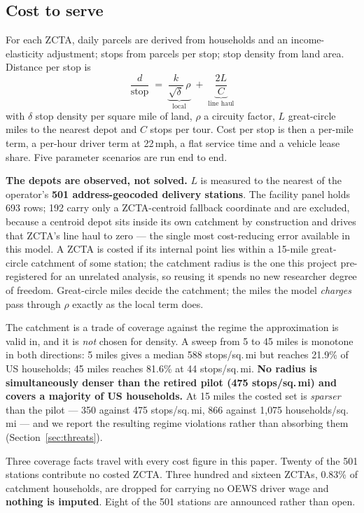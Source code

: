 \documentclass[conference]{IEEEtran}
\begin{document}
\subsection{Cost to serve}

For each ZCTA, daily parcels are derived from households and an
income-elasticity adjustment; stops from parcels per stop; stop density from
land area. Distance per stop is
\begin{equation}
\frac{d}{\text{stop}} \;=\;
\underbrace{\frac{k}{\sqrt{\delta}}\,\rho}_{\text{local}}
\;+\;
\underbrace{\frac{2L}{C}}_{\text{line haul}}
\end{equation}
with $\delta$ stop density per square mile of land, $\rho$ a circuity factor,
$L$ great-circle miles to the nearest depot and $C$ stops per tour. Cost per
stop is then a per-mile term, a per-hour driver term at 22\,mph, a flat
service time and a vehicle lease share. Five parameter scenarios are run end
to end.

\textbf{The depots are observed, not solved.} $L$ is measured to the nearest
of the operator's \textbf{501 address-geocoded delivery stations}. The
facility panel holds 693 rows; 192 carry only a ZCTA-centroid fallback
coordinate and are excluded, because a centroid depot sits inside its own
catchment by construction and drives that ZCTA's line haul to zero --- the
single most cost-reducing error available in this model. A ZCTA is costed if
its internal point lies within a 15-mile great-circle catchment of some
station; the catchment radius is the one this project pre-registered for an
unrelated analysis, so reusing it spends no new researcher degree of freedom.
Great-circle miles decide the catchment; the miles the model \emph{charges}
pass through $\rho$ exactly as the local term does.

The catchment is a trade of coverage against the regime the approximation is
valid in, and it is \emph{not} chosen for density. A sweep from 5 to 45 miles
is monotone in both directions: 5 miles gives a median 588 stops/sq.\,mi but
reaches 21.9\% of US households; 45 miles reaches 81.6\% at 44 stops/sq.\,mi.
\textbf{No radius is simultaneously denser than the retired pilot
(475 stops/sq.\,mi) and covers a majority of US households.} At 15 miles the
costed set is \emph{sparser} than the pilot --- 350 against 475 stops/sq.\,mi,
866 against 1{,}075 households/sq.\,mi --- and we report the resulting regime
violations rather than absorbing them (Section~\ref{sec:threats}).

Three coverage facts travel with every cost figure in this paper. Twenty of
the 501 stations contribute no costed ZCTA. Three hundred and sixteen ZCTAs,
0.83\% of catchment households, are dropped for carrying no OEWS driver wage
and \textbf{nothing is imputed}. Eight of the 501 stations are announced
rather than open.
\end{document}
